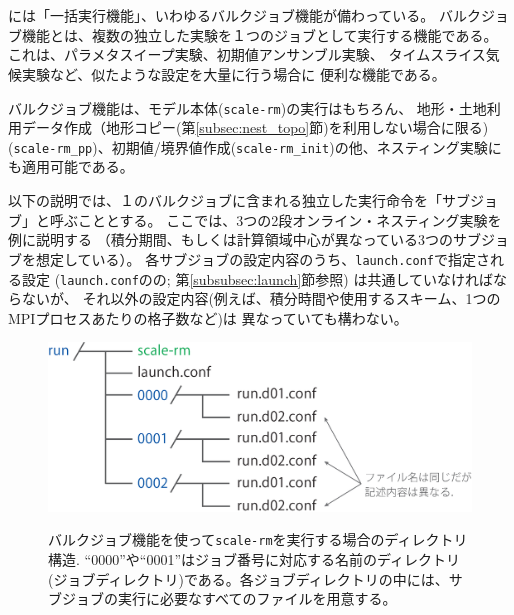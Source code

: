 \section{\SecAdvanceBulkjob} \label{sec:bulkjob}

\scalerm には「一括実行機能」、いわゆるバルクジョブ機能が備わっている。
バルクジョブ機能とは、複数の独立した実験を１つのジョブとして実行する機能である。
これは、パラメタスイープ実験、初期値アンサンブル実験、
タイムスライス気候実験など、似たような設定を大量に行う場合に
便利な機能である。

バルクジョブ機能は、モデル本体(\verb|scale-rm|)の実行はもちろん、
地形・土地利用データ作成（地形コピー(第\ref{subsec:nest_topo}節)を利用しない場合に限る) (\verb|scale-rm_pp|)、初期値/境界値作成(\verb|scale-rm_init|)の他、ネスティング実験にも適用可能である。

以下の説明では、１のバルクジョブに含まれる独立した実行命令を「サブジョブ」と呼ぶこととする。
ここでは、3つの2段オンライン・ネスティング実験を例に説明する
（積分期間、もしくは計算領域中心が異なっている3つのサブジョブを想定している）。
%
各サブジョブの設定内容のうち、\verb|launch.conf|で指定される設定
(\verb|launch.conf|のの;
第\ref{subsubsec:launch}節参照) は共通していなければならないが、
それ以外の設定内容(例えば、積分時間や使用するスキーム、1つのMPIプロセスあたりの格子数など)は
異なっていても構わない。


\begin{figure}[t]
\begin{center}
  \includegraphics[width=0.6\hsize]{./figure/bulkjob_directory_structure.eps}\\
  \caption{バルクジョブ機能を使って\texttt{scale-rm}を実行する場合のディレクトリ構造. ``0000''や``0001''はジョブ番号に対応する名前のディレクトリ(ジョブディレクトリ)である。各ジョブディレクトリの中には、サブジョブの実行に必要なすべてのファイルを用意する。}
  \label{fig_bulkjob}
\end{center}
\end{figure}


